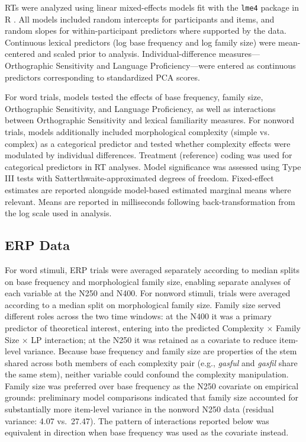 \documentclass[utf8]{FrontiersinHarvard} %
\begin{document}
	RTs were analyzed using linear mixed-effects models fit with the \texttt{lme4} package \citep{batesFittingLinearMixedeffects2015} in R \citep{rcoreteamLanguageEnvironmentStatistical2026}. All models included random intercepts for participants and items, and random slopes for within-participant predictors where supported by the data. Continuous lexical predictors (log base frequency and log family size) were mean-centered and scaled prior to analysis. Individual-difference measures—Orthographic Sensitivity and Language Proficiency—were entered as continuous predictors corresponding to standardized PCA scores.
	
	For word trials, models tested the effects of base frequency, family size, Orthographic Sensitivity, and Language Proficiency, as well as interactions between Orthographic Sensitivity and lexical familiarity measures. For nonword trials, models additionally included morphological complexity (simple vs. complex) as a categorical predictor and tested whether complexity effects were modulated by individual differences. Treatment (reference) coding was used for categorical predictors in RT analyses. Model significance was assessed using Type III tests with Satterthwaite-approximated degrees of freedom. Fixed-effect estimates are reported alongside model-based estimated marginal means where relevant. Means are reported in milliseconds following back-transformation from the log scale used in analysis.
	
	\subsection{ERP Data}
	For word stimuli, ERP trials were averaged separately according to median splits on base frequency and morphological family size, enabling separate analyses of each variable at the N250 and N400. For nonword stimuli, trials were averaged according to a median split on morphological family size. Family size served different roles across the two time windows: at the N400 it was a primary predictor of theoretical interest, entering into the predicted Complexity $\times$ Family Size $\times$ LP interaction; at the N250 it was retained as a covariate to reduce item-level variance. Because base frequency and family size are properties of the stem shared across both members of each complexity pair (e.g., \textit{gasful} and \textit{gasfil} share the same stem), neither variable could confound the complexity manipulation. Family size was preferred over base frequency as the N250 covariate on empirical grounds: preliminary model comparisons indicated that family size accounted for substantially more item-level variance in the nonword N250 data (residual variance: 4.07 vs.\ 27.47). The pattern of interactions reported below was equivalent in direction when base frequency was used as the covariate instead.
	
\end{document}
